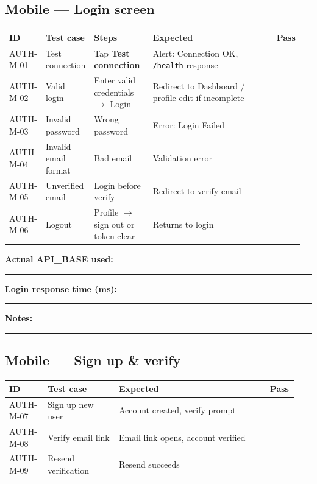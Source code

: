 \documentclass[11pt,a4paper,oneside]{article}
\newcommand{\chk}{\fbox{\rule{0pt}{1.05ex}\rule{1.05ex}{0pt}}}
\newcommand{\fillin}[1][3.5cm]{\rule{#1}{0.4pt}}
\newcommand{\fillinlong}{\rule{0.72\textwidth}{0.4pt}}
\newcommand{\notesblock}{\par\smallskip\noindent\textbf{Notes:}\ \fillinlong\par\smallskip}
\newcommand{\fieldline}[1]{\par\smallskip\noindent\textbf{#1}\ \fillin\par}
\newcommand{\tcheadfour}{%
  \toprule
  \textbf{ID} & \textbf{Test case} & \textbf{Expected} & \textbf{Pass} \\
  \midrule
}
\newcommand{\tcheadfive}{%
  \toprule
  \textbf{ID} & \textbf{Test case} & \textbf{Steps} & \textbf{Expected} & \textbf{Pass} \\
  \midrule
}
\begin{document}
\subsection{Mobile — Login screen}

\small
\begin{tabular}{@{}>{\raggedright\arraybackslash}p{0.11\linewidth} >{\raggedright\arraybackslash}p{0.16\linewidth} >{\raggedright\arraybackslash}p{0.20\linewidth} >{\raggedright\arraybackslash}p{0.43\linewidth} >{\centering\arraybackslash}p{0.06\linewidth}@{}}
  \tcheadfive
  AUTH-M-01 & Test connection      & Tap \textbf{Test connection}                          & Alert: Connection OK, \texttt{/health} response              & \chk \\
  AUTH-M-02 & Valid login            & Enter valid credentials $\rightarrow$ Login             & Redirect to Dashboard / profile-edit if incomplete           & \chk \\
  AUTH-M-03 & Invalid password       & Wrong password                                        & Error: Login Failed                                            & \chk \\
  AUTH-M-04 & Invalid email format   & Bad email                                             & Validation error                                               & \chk \\
  AUTH-M-05 & Unverified email       & Login before verify                                   & Redirect to verify-email                                       & \chk \\
  AUTH-M-06 & Logout                 & Profile $\rightarrow$ sign out or token clear         & Returns to login                                               & \chk \\
  \bottomrule
\end{tabular}
\normalsize

\fieldline{Actual API\_BASE used:}
\fieldline{Login response time (ms):}
\notesblock

\subsection{Mobile — Sign up \& verify}

\small
\begin{tabular}{@{}>{\raggedright\arraybackslash}p{0.13\linewidth} >{\raggedright\arraybackslash}p{0.24\linewidth} >{\raggedright\arraybackslash}p{0.51\linewidth} >{\centering\arraybackslash}p{0.06\linewidth}@{}}
  \tcheadfour
  AUTH-M-07 & Sign up new user     & Account created, verify prompt     & \chk \\
  AUTH-M-08 & Verify email link    & Email link opens, account verified & \chk \\
  AUTH-M-09 & Resend verification  & Resend succeeds                    & \chk \\
  \bottomrule
\end{tabular}
\normalsize
\end{document}
